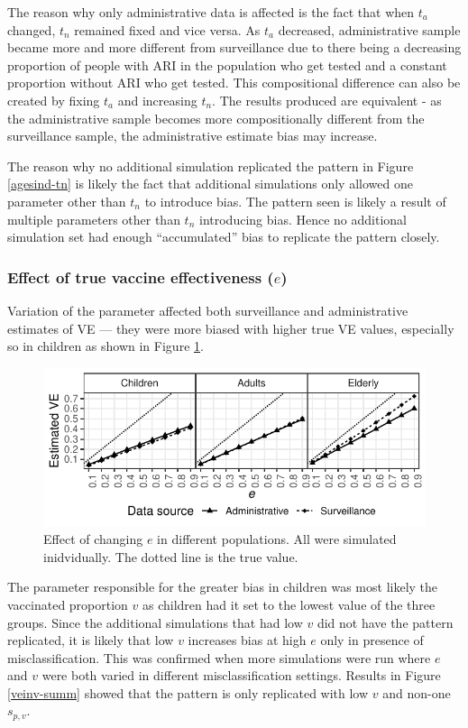 \documentclass[11pt]{article}
\begin{document}
\pagebreak

The reason why only administrative data is affected is the fact that when $t_a$ changed, $t_n$ remained fixed and vice versa. As $t_a$ decreased, administrative sample became more and more different from surveillance due to there being a decreasing proportion of people with ARI in the population who get tested and a constant proportion without ARI who get tested. This compositional difference can also be created by fixing $t_a$ and increasing $t_n$. The results produced are equivalent - as the administrative sample becomes more compositionally different from the surveillance sample, the administrative estimate bias may increase. 

The reason why no additional simulation replicated the pattern in Figure \ref{agesind-tn} is likely the fact that additional simulations only allowed one parameter other than $t_n$ to introduce bias. The pattern seen is likely a result of multiple parameters other than $t_n$ introducing bias. Hence no additional simulation set had enough ``accumulated'' bias to replicate the pattern closely.

\subsubsection{Effect of true vaccine effectiveness ($e$)}

Variation of the parameter affected both surveillance and administrative estimates of VE --- they were more biased with higher true VE values, especially so in children as shown in Figure \ref{agesind-ve}.

\begin{figure}[h]
	\centering
		\includegraphics[width=0.75\linewidth]{../fig-agesind/agesind-ve.pdf}
		\caption{
Effect of changing $e$ in different populations. All were simulated inidvidually. The dotted line is the true value. \label{agesind-ve}
		}
\end{figure}

The parameter responsible for the greater bias in children was most likely the vaccinated proportion $v$ as children had it set to the lowest value of the three groups. Since the additional simulations that had low $v$ did not have the pattern replicated, it is likely that low $v$ increases bias at high $e$ only in presence of misclassification. This was confirmed when more simulations were run where $e$ and $v$ were both varied in different misclassification settings. Results in Figure \ref{veinv-summ} showed that the pattern is only replicated with low $v$ and non-one $s_{p,v}$.
\end{document}
